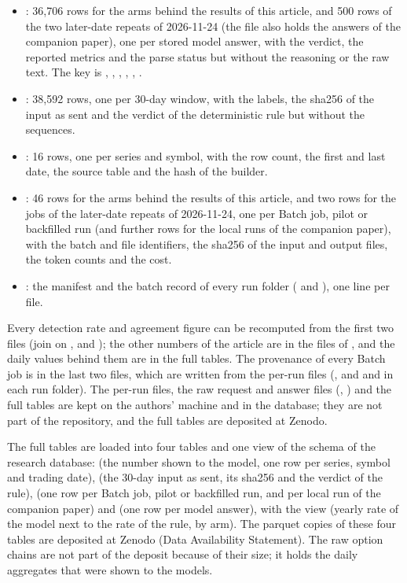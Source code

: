 \begin{itemize}[leftmargin=*,labelsep=5.5mm]
\item {}: 36{,}706 rows for the arms behind the results of this article, and 500 rows of the two later-date repeats of 2026-11-24 (the file also holds the answers of the companion paper), one per stored model answer, with the verdict, the reported metrics and the parse status but without the reasoning or the raw text. The key is , , , , , .
\item {}: 38{,}592 rows, one per 30-day window, with the labels, the sha256 of the input as sent and the verdict of the deterministic rule but without the sequences.
\item {}: 16 rows, one per series and symbol, with the row count, the first and last date, the source table and the hash of the builder.
\item {}: 46 rows for the arms behind the results of this article, and two rows for the jobs of the later-date repeats of 2026-11-24, one per Batch job, pilot or backfilled run (and further rows for the local runs of the companion paper), with the batch and file identifiers, the sha256 of the input and output files, the token counts and the cost.
\item {}: the manifest and the batch record of every run folder ( and ), one line per file.
\end{itemize}
Every detection rate and agreement figure can be recomputed from the first two files (join on ,  and ); the other numbers of the article are in the files of , and the daily values behind them are in the full tables. The provenance of every Batch job is in the last two files, which are written from the per-run files (, and  and  in each run folder). The per-run files, the raw request and answer files (, ) and the full tables are kept on the authors' machine and in the database; they are not part of the repository, and the full tables are deposited at Zenodo.

The full tables are loaded into four tables and one view of the schema  of the research database:  (the number shown to the model, one row per series, symbol and trading date),  (the 30-day input as sent, its sha256 and the verdict of the rule),  (one row per Batch job, pilot or backfilled run, and per local run of the companion paper) and  (one row per model answer), with the view  (yearly rate of the model next to the rate of the rule, by arm). The parquet copies of these four tables are deposited at Zenodo (Data Availability Statement). The raw option chains are not part of the deposit because of their size; it holds the daily aggregates that were shown to the models.
